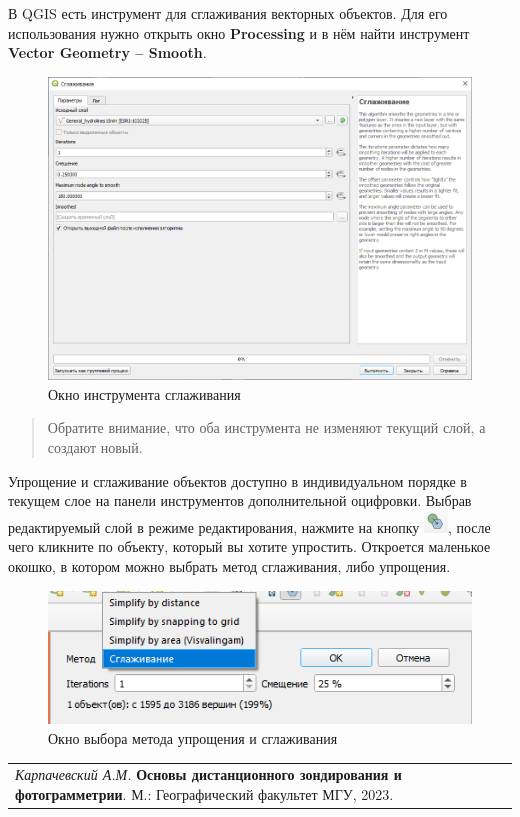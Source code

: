 \documentclass[
  12pt,
]{book}
\begin{document}
В QGIS есть инструмент для сглаживания векторных объектов. Для его использования нужно открыть окно \textbf{Processing} и в нём найти инструмент \textbf{Vector Geometry -- Smooth}.

\begin{figure}
\centering
\includegraphics{images/Ref19/Smooth.png}
\caption{Окно инструмента сглаживания}
\end{figure}

\begin{quote}
Обратите внимание, что оба инструмента не изменяют текущий слой, а создают новый.
\end{quote}

Упрощение и сглаживание объектов доступно в индивидуальном порядке в текущем слое на панели инструментов дополнительной оцифровки. Выбрав редактируемый слой в режиме редактирования, нажмите на кнопку \includegraphics{images/Ref19/Simplify_button.png}, после чего кликните по объекту, который вы хотите упростить. Откроется маленькое окошко, в котором можно выбрать метод сглаживания, либо упрощения.

\begin{figure}
\centering
\includegraphics{images/Ref19/Simplifying.png}
\caption{Окно выбора метода упрощения и сглаживания}
\end{figure}

\begin{longtable}[]{@{}l@{}}
\toprule\noalign{}
\endhead
\bottomrule\noalign{}
\endlastfoot
\emph{Карпачевский А.М.} \textbf{Основы дистанционного зондирования и фотограмметрии}. М.: Географический факультет МГУ, 2023. \\
\end{longtable}

  
\end{document}
